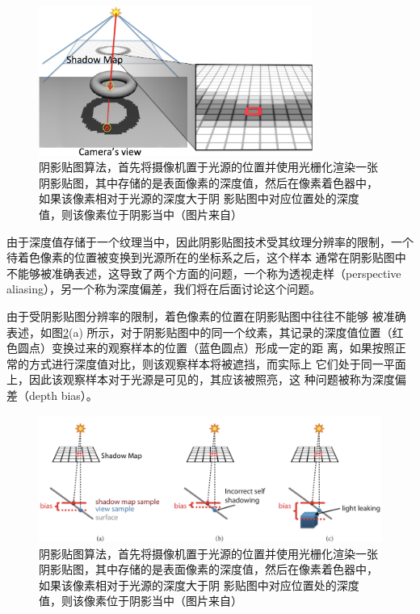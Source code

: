 \begin{figure}
\begin{center}
	\includegraphics[width=0.8\textwidth]{figures/shadows/shadow-map}
	\end{center}
	\caption{阴影贴图算法，首先将摄像机置于光源的位置并使用光栅化渲染一张阴影贴图，其中存储的是表面像素的深度值，然后在像素着色器中，如果该像素相对于光源的深度大于阴 影贴图中对应位置处的深度值，则该像素位于阴影当中（图片来自\cite{b:rts}）}
	\label{f:df-shadow-map}
\end{figure}

由于深度值存储于一个纹理当中，因此阴影贴图技术受其纹理分辨率的限制，一个待着色像素的位置被变换到光源所在的坐标系之后，这个样本 通常在阴影贴图中不能够被准确表述，这导致了两个方面的问题，一个称为透视走样（perspective aliasing），另一个称为深度偏差，我们将在后面讨论这个问题。

由于受阴影贴图分辨率的限制，着色像素的位置在阴影贴图中往往不能够 被准确表述，如图\ref{f:df-depth-bias}(a) 所示，对于阴影贴图中的同一个纹素，其记录的深度值位置（红色圆点）变换过来的观察样本的位置（蓝色圆点）形成一定的距 离，如果按照正常的方式进行深度值对比，则该观察样本将被遮挡，而实际上 它们处于同一平面上，因此该观察样本对于光源是可见的，其应该被照亮，这 种问题被称为深度偏差（depth bias）。

\begin{figure}
\begin{fullwidth}
	\includegraphics[width=\thewidth]{figures/shadows/depth-bias}
	\caption{阴影贴图算法，首先将摄像机置于光源的位置并使用光栅化渲染一张阴影贴图，其中存储的是表面像素的深度值，然后在像素着色器中，如果该像素相对于光源的深度大于阴 影贴图中对应位置处的深度值，则该像素位于阴影当中（图片来自\cite{b:rts}）}
	\label{f:df-depth-bias}
\end{fullwidth}
\end{figure}

